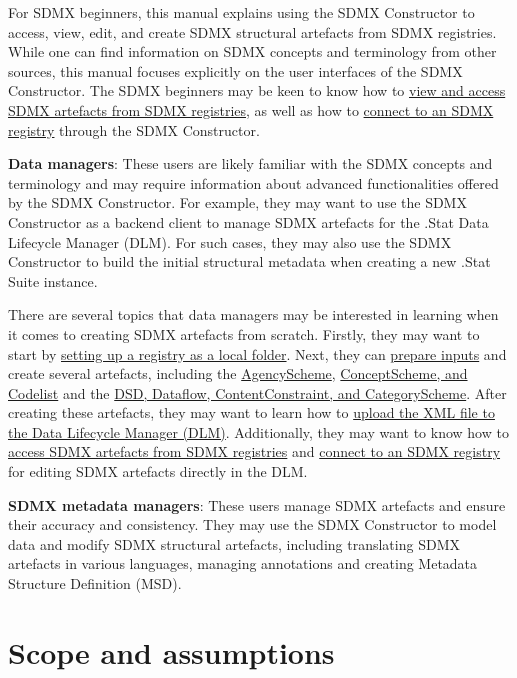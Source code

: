 \documentclass[
]{book}
\begin{document}
For SDMX beginners, this manual explains using the SDMX Constructor to access, view, edit, and create SDMX structural artefacts from SDMX registries. While one can find information on SDMX concepts and terminology from other sources, this manual focuses explicitly on the user interfaces of the SDMX Constructor. The SDMX beginners may be keen to know how to \protect\hyperlink{accessing-sdmx}{view and access SDMX artefacts from SDMX registries}, as well as how to \protect\hyperlink{connecting-to}{connect to an SDMX registry} through the SDMX Constructor.

\textbf{Data managers}: These users are likely familiar with the SDMX concepts and terminology and may require information about advanced functionalities offered by the SDMX Constructor. For example, they may want to use the SDMX Constructor as a backend client to manage SDMX artefacts for the .Stat Data Lifecycle Manager (DLM). For such cases, they may also use the SDMX Constructor to build the initial structural metadata when creating a new .Stat Suite instance.

There are several topics that data managers may be interested in learning when it comes to creating SDMX artefacts from scratch. Firstly, they may want to start by \protect\hyperlink{setting-up}{setting up a registry as a local folder}. Next, they can \protect\hyperlink{preparing-inputs}{prepare inputs} and create several artefacts, including the \protect\hyperlink{creating-agencyscheme}{AgencyScheme}, \protect\hyperlink{creating-conceptscheme}{ConceptScheme, and Codelist} and the \protect\hyperlink{creating-dsd}{DSD, Dataflow, ContentConstraint, and CategoryScheme}. After creating these artefacts, they may want to learn how to \protect\hyperlink{uploading-xml}{upload the XML file to the Data Lifecycle Manager (DLM)}. Additionally, they may want to know how to \protect\hyperlink{accessing-sdmx}{access SDMX artefacts from SDMX registries} and \protect\hyperlink{connecting-to}{connect to an SDMX registry} for editing SDMX artefacts directly in the DLM.

\textbf{SDMX metadata managers}: These users manage SDMX artefacts and ensure their accuracy and consistency. They may use the SDMX Constructor to model data and modify SDMX structural artefacts, including translating SDMX artefacts in various languages, managing annotations and creating Metadata Structure Definition (MSD).

\hypertarget{scope-and-assumptions}{%
\section*{Scope and assumptions}\label{scope-and-assumptions}}
\end{document}
